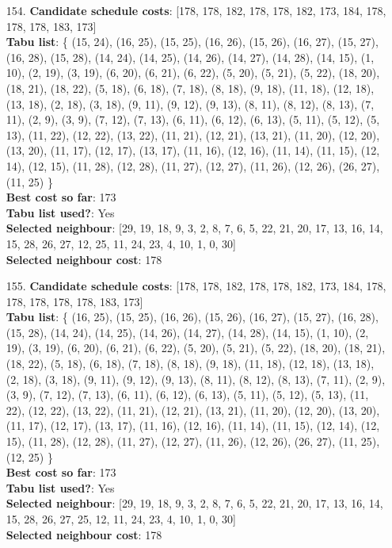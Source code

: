 \documentclass[fleqn]{article}
\begin{document}
\begin{itemize}
    \item[154.] \textbf{Candidate schedule costs}: [178, 178, 182, 178, 178, 182, 173, 184, 178, 178, 178, 183, 173] \\
    \textbf{Tabu list}: \{ (15, 24), (16, 25), (15, 25), (16, 26), (15, 26), (16, 27), (15, 27), (16, 28), (15, 28), (14, 24), (14, 25), (14, 26), (14, 27), (14, 28), (14, 15), (1, 10), (2, 19), (3, 19), (6, 20), (6, 21), (6, 22), (5, 20), (5, 21), (5, 22), (18, 20), (18, 21), (18, 22), (5, 18), (6, 18), (7, 18), (8, 18), (9, 18), (11, 18), (12, 18), (13, 18), (2, 18), (3, 18), (9, 11), (9, 12), (9, 13), (8, 11), (8, 12), (8, 13), (7, 11), (2, 9), (3, 9), (7, 12), (7, 13), (6, 11), (6, 12), (6, 13), (5, 11), (5, 12), (5, 13), (11, 22), (12, 22), (13, 22), (11, 21), (12, 21), (13, 21), (11, 20), (12, 20), (13, 20), (11, 17), (12, 17), (13, 17), (11, 16), (12, 16), (11, 14), (11, 15), (12, 14), (12, 15), (11, 28), (12, 28), (11, 27), (12, 27), (11, 26), (12, 26), (26, 27), (11, 25) \} \\
    \textbf{Best cost so far}: 173 \\
    \textbf{Tabu list used?}: Yes \\
    \textbf{Selected neighbour}: [29, 19, 18, 9, 3, 2, 8, 7, 6, 5, 22, 21, 20, 17, 13, 16, 14, 15, 28, 26, 27, 12, 25, 11, 24, 23, 4, 10, 1, 0, 30] \\
    \textbf{Selected neighbour cost}: 178
      

    \item[155.] \textbf{Candidate schedule costs}: [178, 178, 182, 178, 178, 182, 173, 184, 178, 178, 178, 178, 178, 183, 173] \\
    \textbf{Tabu list}: \{ (16, 25), (15, 25), (16, 26), (15, 26), (16, 27), (15, 27), (16, 28), (15, 28), (14, 24), (14, 25), (14, 26), (14, 27), (14, 28), (14, 15), (1, 10), (2, 19), (3, 19), (6, 20), (6, 21), (6, 22), (5, 20), (5, 21), (5, 22), (18, 20), (18, 21), (18, 22), (5, 18), (6, 18), (7, 18), (8, 18), (9, 18), (11, 18), (12, 18), (13, 18), (2, 18), (3, 18), (9, 11), (9, 12), (9, 13), (8, 11), (8, 12), (8, 13), (7, 11), (2, 9), (3, 9), (7, 12), (7, 13), (6, 11), (6, 12), (6, 13), (5, 11), (5, 12), (5, 13), (11, 22), (12, 22), (13, 22), (11, 21), (12, 21), (13, 21), (11, 20), (12, 20), (13, 20), (11, 17), (12, 17), (13, 17), (11, 16), (12, 16), (11, 14), (11, 15), (12, 14), (12, 15), (11, 28), (12, 28), (11, 27), (12, 27), (11, 26), (12, 26), (26, 27), (11, 25), (12, 25) \} \\
    \textbf{Best cost so far}: 173 \\
    \textbf{Tabu list used?}: Yes \\
    \textbf{Selected neighbour}: [29, 19, 18, 9, 3, 2, 8, 7, 6, 5, 22, 21, 20, 17, 13, 16, 14, 15, 28, 26, 27, 25, 12, 11, 24, 23, 4, 10, 1, 0, 30] \\
    \textbf{Selected neighbour cost}: 178
      


\end{itemize}
\end{document}
